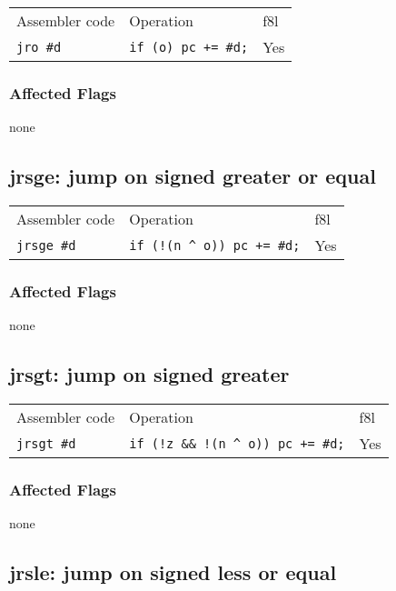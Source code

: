 \documentclass{book}
\begin{document}
\begin{tabular}{l l l}
Assembler code   & Operation                  & f8l \\
\texttt{jro \#d} & \texttt{if (o) pc += \#d;} & Yes \\
\end{tabular}

\subsubsection*{Affected Flags}

none


\subsection{jrsge: jump on signed greater or equal}

\begin{tabular}{l l l}
Assembler code     & Operation                            & f8l \\
\texttt{jrsge \#d} & \texttt{if (!(n \^{} o)) pc += \#d;} & Yes \\
\end{tabular}

\subsubsection*{Affected Flags}

none


\subsection{jrsgt: jump on signed greater}

\begin{tabular}{l l l}
Assembler code     & Operation                            & f8l \\
\texttt{jrsgt \#d} & \texttt{if (!z \&\& !(n \^{} o)) pc += \#d;} & Yes \\
\end{tabular}

\subsubsection*{Affected Flags}

none

\subsection{jrsle: jump on signed less or equal}
\end{document}
